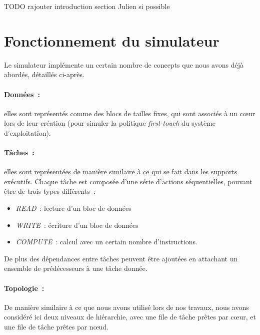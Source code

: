 \begin{todo}
TODO rajouter introduction section Julien si possible
\end{todo}


\section{Fonctionnement du simulateur}\label{sec:simulation:archi}

Le simulateur implémente un certain nombre de concepts que nous avons déjà abordés, détaillés ci-après.


\paragraph{Données~:} elles sont représentés comme des blocs de tailles fixes, qui sont associés à un cœur lors de leur création (pour simuler la politique \emph{first-touch} du système d'exploitation).

\paragraph{Tâches~:} elles sont représentées de manière similaire à ce qui se fait dans les supports exécutifs.
Chaque tâche est composée d'une série d'actions séquentielles, pouvant être de trois types différents~:
\begin{itemize}
  \item \emph{READ}~: lecture d'un bloc de données
  \item \emph{WRITE}~: écriture d'un bloc de données
  \item \emph{COMPUTE}~: calcul avec un certain nombre d'instructions.
\end{itemize}

De plus des dépendances entre tâches peuvent être ajoutées en attachant un ensemble de prédécesseurs à une tâche donnée.

\paragraph{Topologie~:}
De manière similaire à ce que nous avons utilisé lors de nos travaux, nous avons considéré ici deux niveaux de hiérarchie, avec une file de tâche prêtes par cœur, et une file de tâche prêtes par nœud.

